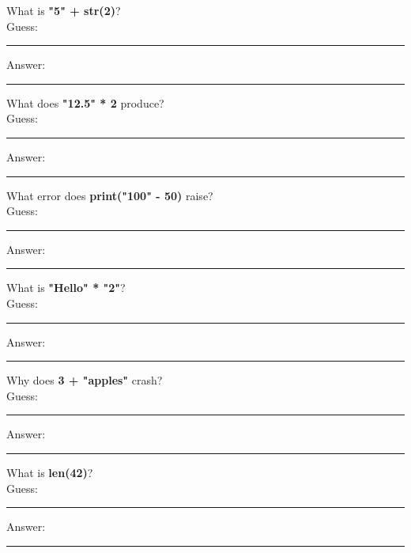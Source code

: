 \documentclass{article}
\begin{document}
\begin{tasks}[
    style=enumerate,
    label-format=\bfseries,
    label-width=1.5em,
    item-indent=2em,
    column-sep=1em,
    after-item-skip=2em
  ]
        \task What is \textbf{"5" + str(2)}? \\ 
        Guess:  \vspace{3mm}\\
        \rule{\linewidth}{0.4pt} %
        Answer:  \vspace{3mm}\\
        \rule{\linewidth}{0.4pt} %

        \task What does \textbf{"12.5" * 2} produce?  \\
        Guess:  \vspace{3mm}\\
        \rule{\linewidth}{0.4pt} %
        Answer:  \vspace{3mm}\\
        \rule{\linewidth}{0.4pt} %

        \task What error does \textbf{print("100" - 50)} raise?  \\
        Guess:  \vspace{3mm}\\
        \rule{\linewidth}{0.4pt} %
        Answer:  \vspace{3mm}\\
        \rule{\linewidth}{0.4pt} %

        \task What is \textbf{"Hello" * "2"}?  \\
        Guess:  \vspace{3mm}\\
        \rule{\linewidth}{0.4pt} %
        Answer:  \vspace{3mm}\\
        \rule{\linewidth}{0.4pt} %

        \task Why does \textbf{3 + "apples"} crash?  \\
        Guess:  \vspace{3mm}\\
        \rule{\linewidth}{0.4pt} %
        Answer:  \vspace{3mm}\\
        \rule{\linewidth}{0.4pt} %

        \task What is \textbf{len(42)}?  \\
        Guess:  \vspace{3mm}\\
        \rule{\linewidth}{0.4pt} %
        Answer:  \vspace{3mm}\\
        \rule{\linewidth}{0.4pt} %


\end{tasks}
\end{document}
